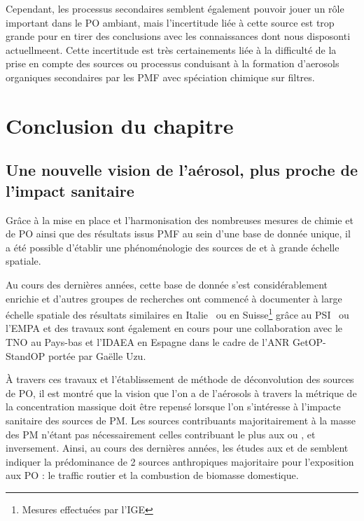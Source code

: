 Cependant, les processus secondaires semblent également pouvoir jouer un rôle important
dans le PO ambiant, mais l'incertitude liée à cette source est trop grande pour en tirer
des conclusions avec les connaissances dont nous disposonti actuellmeent. Cette
incertitude est très certainements liée à la difficulté de la prise en compte des sources
ou processus conduisant à la formation d'aerosols organiques secondaires par les PMF avec
spéciation chimique sur filtres.


\section{Conclusion du chapitre}%
\label{sec:conclusion_chap4}

\subsection{Une nouvelle vision de l'aérosol, plus proche de l'impact sanitaire}%
\label{sub:une_nouvelle_vision_de_l_aérosol_plus_proche_de_l_impact_sanitaire}

Grâce à la mise en place et l'harmonisation des nombreuses mesures de chimie et de PO
ainsi que des résultats issus PMF au sein d'une base de donnée unique, il a été possible
d'établir une phénoménologie des sources de \POAA{} et \PODTT{} à grande échelle spatiale.

Au cours des dernières années, cette base de donnée s'est considérablement enrichie et
d'autres groupes de recherches ont commencé à documenter à large échelle spatiale des
résultats similaires en Italie~\autocite{pietrograndeReview2019} ou en
Suisse\footnote{Mesures effectuées par l'IGE} grâce au
PSI~\autocite{daellenbachSourcessubmitted} ou l'EMPA et des travaux sont également en
cours pour une collaboration avec le TNO au Pays-bas et l'IDAEA en Espagne dans le cadre
de l'ANR GetOP-StandOP portée par Gaëlle Uzu.

À travers ces travaux et l'établissement de méthode de déconvolution des sources de PO, il
est montré que la vision que l'on a de l'aérosols à travers la métrique de la
concentration massique doit être repensé lorsque l'on s'intéresse à l'impacte sanitaire
des sources de PM. Les sources contribuants majoritairement à la masse des PM n'étant pas
nécessairement celles contribuant le plus aux \POAA{} ou \PODTT, et inversement.
Ainsi, au cours des dernières années, les études aux \POAA{} et \PODTT{} de
\cite{vermaReactive2014,batesReactive2015,fangOxidative2016,weberApportionment2018,cesariSource2019,daellenbachSourcessubmitted,weberSourceinprep.}
semblent indiquer la prédominance de 2 sources anthropiques majoritaire pour l'exposition
aux PO : le traffic routier et la combustion de biomasse domestique.

